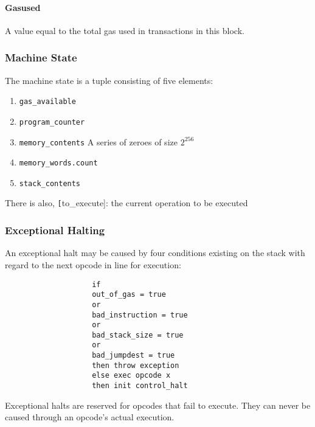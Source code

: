 \documentclass[10pt,letterpaper,leqno,bibliography=totoc]{scrartcl}
\newenvironment{alphafootnotes}
{\par\edef\savedfootnotenumber{\number\value{footnote}}
\renewcommand{\thefootnote}{\alph{footnote}}
\setcounter{footnote}{0}}
{\par\setcounter{footnote}{\savedfootnotenumber}}
\begin{document}
\begin{alphafootnotes}
\begin{multicols*}{2}
				
				\paragraph{Gasused}
				A value equal to the total gas used in transactions in this block. 

				\subsubsection{Machine State}
				The machine state is a tuple consisting of five elements:
		
		\begin{enumerate}
			\item \texttt{gas\_available}
			\item \texttt{program\_counter}
			\item \texttt{memory\_contents} A series of zeroes of size $2^{256}$
			\item \texttt{memory\_words.count}
			\item \texttt{stack\_contents}
		\end{enumerate}

		There is also, \texttt[to\_execute]: the current operation to be executed
		
				\subsubsection{Exceptional Halting}
				An exceptional halt may be caused by four conditions existing on the stack with regard to the next opcode in line for execution:
		
					\begin{verbatim}
					if 
					out_of_gas = true 
					or
					bad_instruction = true
					or
					bad_stack_size = true
					or
					bad_jumpdest = true
					then throw exception
					else exec opcode x
					then init control_halt
					\end{verbatim}	
		
		Exceptional halts are reserved for opcodes that fail to execute. They can never be caused through an opcode's actual execution.
		

\end{multicols*}
\end{alphafootnotes}
\end{document}
